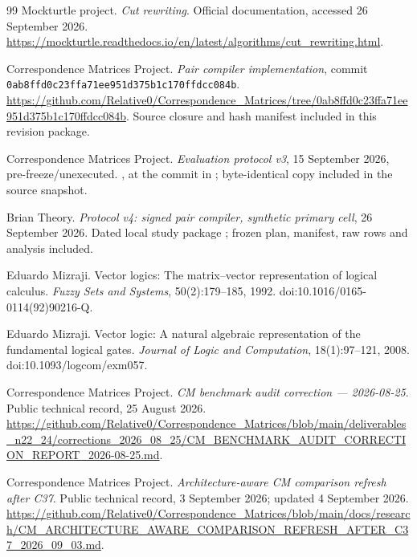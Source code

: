 \documentclass[10pt]{article}
\theoremstyle{plain}
\theoremstyle{definition}
\theoremstyle{remark}
\begin{document}
\begin{thebibliography}{99}
Mockturtle project.
\newblock \emph{Cut rewriting}.
\newblock Official documentation, accessed 26 September 2026.
\newblock \url{https://mockturtle.readthedocs.io/en/latest/algorithms/cut_rewriting.html}.

Correspondence Matrices Project.
\newblock \emph{Pair compiler implementation}, commit \texttt{0ab8ffd0c23ffa71ee951d375b1c170ffdcc084b}.
\newblock \url{https://github.com/Relative0/Correspondence_Matrices/tree/0ab8ffd0c23ffa71ee951d375b1c170ffdcc084b}.
\newblock Source closure and hash manifest included in this revision package.

Correspondence Matrices Project.
\newblock \emph{Evaluation protocol v3}, 15 September 2026, pre-freeze/unexecuted.
\newblock {}, at the commit in \cite{CompilerSnapshot2026}; byte-identical copy included in the source snapshot.

Brian Theory.
\newblock \emph{Protocol v4: signed pair compiler, synthetic primary cell}, 26 September 2026.
\newblock Dated local study package ; frozen plan, manifest, raw rows and analysis included.

Eduardo Mizraji.
\newblock Vector logics: The matrix--vector representation of logical calculus.
\newblock \emph{Fuzzy Sets and Systems}, 50(2):179--185, 1992.
\newblock doi:10.1016/0165-0114(92)90216-Q.

Eduardo Mizraji.
\newblock Vector logic: A natural algebraic representation of the fundamental logical gates.
\newblock \emph{Journal of Logic and Computation}, 18(1):97--121, 2008.
\newblock doi:10.1093/logcom/exm057.

Correspondence Matrices Project.
\newblock \emph{CM benchmark audit correction --- 2026-08-25}.
\newblock Public technical record, 25 August 2026.
\newblock \url{https://github.com/Relative0/Correspondence_Matrices/blob/main/deliverables_n22_24/corrections_2026_08_25/CM_BENCHMARK_AUDIT_CORRECTION_REPORT_2026-08-25.md}.

Correspondence Matrices Project.
\newblock \emph{Architecture-aware CM comparison refresh after C37}.
\newblock Public technical record, 3 September 2026; updated 4 September 2026.
\newblock \url{https://github.com/Relative0/Correspondence_Matrices/blob/main/docs/research/CM_ARCHITECTURE_AWARE_COMPARISON_REFRESH_AFTER_C37_2026_09_03.md}.


\end{thebibliography}
\end{document}
